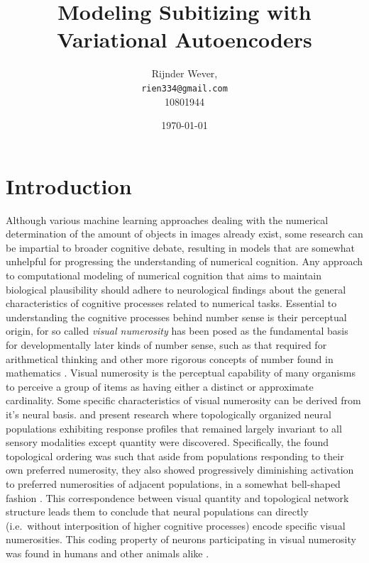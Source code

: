 \documentclass[twocolumn]{article}
\title{Modeling Subitizing with Variational Autoencoders}
\author{Rijnder Wever,\\\texttt{rien334@gmail.com}\\10801944}
\date{\today}
\begin{document}
\maketitle

\hypertarget{introduction}{%
\section{Introduction}\label{introduction}}

Although various machine learning approaches dealing with the numerical
determination of the amount of objects in images already exist, some
research can be impartial to broader cognitive debate, resulting in
models that are somewhat unhelpful for progressing the understanding of
numerical cognition. Any approach to computational modeling of numerical
cognition that aims to maintain biological plausibility should adhere to
neurological findings about the general characteristics of cognitive
processes related to numerical tasks. Essential to understanding the
cognitive processes behind number sense is their perceptual origin, for
so called \emph{visual numerosity} has been posed as the fundamental
basis for developmentally later kinds of number sense, such as that
required for arithmetical thinking and other more rigorous concepts of
number found in mathematics \citetext{\citealp[ chap.
2]{lakoff}; \citealp{numerosity-basis}}. Visual numerosity is the
perceptual capability of many organisms to perceive a group of items as
having either a distinct or approximate cardinality. Some specific
characteristics of visual numerosity can be derived from it's neural
basis. \citet{nieder2016neuronal} and \citet{harvey2013topographic}
present research where topologically organized neural populations
exhibiting response profiles that remained largely invariant to all
sensory modalities except quantity were discovered. Specifically, the
found topological ordering was such that aside from populations
responding to their own preferred numerosity, they also showed
progressively diminishing activation to preferred numerosities of
adjacent populations, in a somewhat bell-shaped fashion
\citep{nieder2016neuronal}. This correspondence between visual quantity
and topological network structure leads them to conclude that neural
populations can directly (i.e.~without interposition of higher cognitive
processes) encode specific visual numerosities. This coding property of
neurons participating in visual numerosity was found in humans and other
animals alike \citep[see][]{nieder2016neuronal, harvey2013topographic}.
\end{document}
